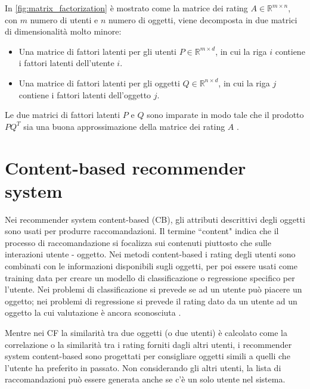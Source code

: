In \autoref{fig:matrix_factorization} è mostrato come la matrice dei rating $A \in \mathbb{R}^{m \times n}$, con $m$ numero di utenti e $n$ numero di oggetti, viene decomposta in due matrici di dimensionalità molto minore:

\begin{itemize}
	\item Una matrice di fattori latenti per gli utenti $P \in \mathbb{R}^{m \times d}$, in cui la riga $i$ contiene i fattori latenti dell'utente $i$.
	\item Una matrice di fattori latenti per gli oggetti $Q \in \mathbb{R}^{n \times d}$, in cui la riga $j$ contiene i fattori latenti dell'oggetto $j$.
\end{itemize}
Le due matrici di fattori latenti $P$ e $Q$ sono imparate in modo tale che il prodotto $PQ^T$ sia una buona approssimazione della matrice dei rating $A$ \cite{mf-google}. %

\section{Content-based recommender system}
Nei recommender system content-based (CB), gli attributi descrittivi degli oggetti sono usati per produrre raccomandazioni. Il termine ``content" indica che il processo di raccomandazione si focalizza sui contenuti piuttosto che sulle interazioni utente - oggetto. Nei metodi content-based i rating degli utenti sono combinati con le informazioni disponibili sugli oggetti, per poi essere usati come training data per creare un modello di classificazione o regressione  specifico per l'utente. Nei problemi di classificazione si prevede se ad un utente può piacere un oggetto; nei problemi di regressione si prevede il rating dato da un utente ad un oggetto la cui valutazione è ancora sconosciuta \cite{recsys-book}.

Mentre nei CF la similarità tra due oggetti (o due utenti) è calcolato come la correlazione o la similarità tra i rating forniti dagli altri utenti, i recommender system content-based sono progettati per consigliare oggetti simili a quelli che l'utente ha preferito in passato. Non considerando gli altri utenti, la lista di raccomandazioni può essere generata anche se c'è un solo utente nel sistema.

